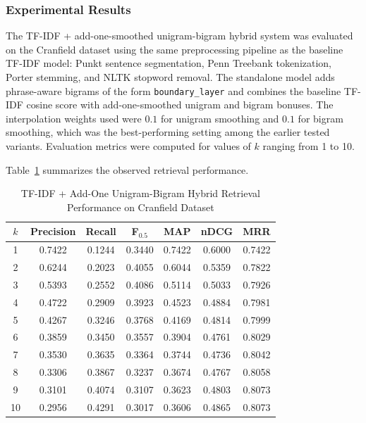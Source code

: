 \subsubsection{Experimental Results}

The TF-IDF + add-one-smoothed unigram-bigram hybrid system was evaluated on the Cranfield dataset using the same preprocessing pipeline as the baseline TF-IDF model: Punkt sentence segmentation, Penn Treebank tokenization, Porter stemming, and NLTK stopword removal.
The standalone model adds phrase-aware bigrams of the form \texttt{boundary\_layer} and combines the baseline TF-IDF cosine score with add-one-smoothed unigram and bigram bonuses.
The interpolation weights used were $0.1$ for unigram smoothing and $0.1$ for bigram smoothing, which was the best-performing setting among the earlier tested variants.
Evaluation metrics were computed for values of $k$ ranging from 1 to 10.

Table~\ref{tab:bigram_smoothing_metrics} summarizes the observed retrieval performance.

\begin{table}[H]
\centering
\caption{TF-IDF + Add-One Unigram-Bigram Hybrid Retrieval Performance on Cranfield Dataset}
\label{tab:bigram_smoothing_metrics}
\begin{tabular}{|c|c|c|c|c|c|c|}
\hline
$k$ & Precision & Recall & F$_{0.5}$ & MAP & nDCG & MRR \\
\hline
1 & 0.7422 & 0.1244 & 0.3440 & 0.7422 & 0.6000 & 0.7422 \\
2 & 0.6244 & 0.2023 & 0.4055 & 0.6044 & 0.5359 & 0.7822 \\
3 & 0.5393 & 0.2552 & 0.4086 & 0.5114 & 0.5033 & 0.7926 \\
4 & 0.4722 & 0.2909 & 0.3923 & 0.4523 & 0.4884 & 0.7981 \\
5 & 0.4267 & 0.3246 & 0.3768 & 0.4169 & 0.4814 & 0.7999 \\
6 & 0.3859 & 0.3450 & 0.3557 & 0.3904 & 0.4761 & 0.8029 \\
7 & 0.3530 & 0.3635 & 0.3364 & 0.3744 & 0.4736 & 0.8042 \\
8 & 0.3306 & 0.3867 & 0.3237 & 0.3674 & 0.4767 & 0.8058 \\
9 & 0.3101 & 0.4074 & 0.3107 & 0.3623 & 0.4803 & 0.8073 \\
10 & 0.2956 & 0.4291 & 0.3017 & 0.3606 & 0.4865 & 0.8073 \\
\hline
\end{tabular}
\end{table}

